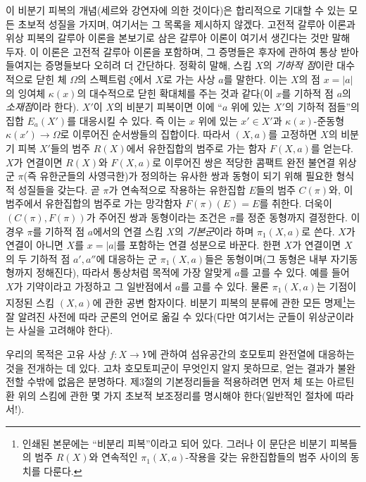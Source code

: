이 비분기 피복의 개념(세르와 강연자에 의한 것이다)은 합리적으로 기대할
수 있는 모든 초보적 성질을 가지며, 여기서는 그 목록을 제시하지 않겠다.
고전적 갈루아 이론과 위상 피복의 갈루아 이론을 본보기로 삼은 갈루아
이론이 여기서 생긴다는 것만 말해 두자. 이 이론은 고전적 갈루아 이론을
포함하며, 그 증명들은 후자에 관하여 통상 받아들여지는 증명들보다 오히려
더 간단하다. 정확히 말해, 스킴 $X$의 \emph{기하적 점}이란 대수적으로
닫힌 체 $\Omega$의 스펙트럼 $\xi$에서 $X$로 가는 사상 $a$를 말한다.
이는 $X$의 점 $x=|a|$의 잉여체 $\kappa(x)$의 대수적으로 닫힌 확대체를
주는 것과 같다(이 $x$를 기하적 점 $a$의 \emph{소재점}이라 한다).
$X'$이 $X$의 비분기 피복이면 이에 ``$a$ 위에 있는 $X'$의 기하적
점들''의 집합 $E_a(X')$를 대응시킬 수 있다. 즉 이는 $x$ 위에 있는
$x'\in X'$과 $\kappa(x)$-준동형
$\kappa(x')\longrightarrow\Omega$로 이루어진 순서쌍들의 집합이다.
따라서 $(X,a)$를 고정하면 $X$의 비분기 피복 $X'$들의 범주 $R(X)$에서
유한집합의 범주로 가는 함자 $F(X,a)$를 얻는다. $X$가 연결이면 $R(X)$와
$F(X,a)$로 이루어진 쌍은 적당한 콤팩트 완전 불연결 위상군 $\pi$(즉
유한군들의 사영극한)가 정의하는 유사한 쌍과 동형이 되기 위해 필요한
형식적 성질들을 갖는다. 곧 $\pi$가 연속적으로 작용하는 유한집합 $E$들의
범주 $C(\pi)$와, 이 범주에서 유한집합의 범주로 가는 망각함자
$F(\pi)(E)=E$를 취한다. 더욱이 $(C(\pi),F(\pi))$가 주어진 쌍과
동형이라는 조건은 $\pi$를 정준 동형까지 결정한다. 이 경우 $\pi$를
기하적 점 $a$에서의 연결 스킴 $X$의 \emph{기본군}이라 하며
$\pi_1(X,a)$로 쓴다. $X$가 연결이 아니면 $X$를 $x=|a|$를 포함하는
연결 성분으로 바꾼다. 한편 $X$가 연결이면 $X$의 두 기하적 점
$a',a''$에 대응하는 군 $\pi_1(X,a)$들은 동형이며(그 동형은 내부
자기동형까지 정해진다), 따라서 통상처럼 목적에 가장 알맞게 $a$를
고를 수 있다. 예를 들어 $X$가 기약이라고 가정하고 그 일반점에서
$a$를 고를 수 있다. 물론 $\pi_1(X,a)$는 기점이 지정된 스킴 $(X,a)$에
관한 공변 함자이다. 비분기 피복의 분류에 관한 모든 명제\footnote{인쇄된
본문에는 ``비분리 피복''이라고 되어 있다. 그러나 이 문단은 비분기
피복들의 범주 $R(X)$와 연속적인 $\pi_1(X,a)$-작용을 갖는 유한집합들의
범주 사이의 동치를 다룬다.}는 잘 알려진 사전에 따라 군론의 언어로
옮길 수 있다(다만 여기서는 군들이 위상군이라는 사실을 고려해야 한다).

우리의 목적은 고유 사상 $f:X\longrightarrow Y$에 관하여 섬유공간의
호모토피 완전열에 대응하는 것을 전개하는 데 있다. 고차 호모토피군이
무엇인지 알지 못하므로, 얻는 결과가 불완전할 수밖에 없음은 분명하다.
제3절의 기본정리들을 적용하려면 먼저 체 또는 아르틴 환 위의 스킴에
관한 몇 가지 초보적 보조정리를 명시해야 한다(일반적인 절차에 따라서!).

